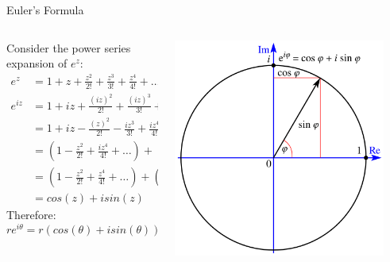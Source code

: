 \documentclass{beamer}
\begin{document}
\begin{frame}[t]{Euler's Formula}
    \begin{columns}
        \hspace{0.5em}
		\begin{column}{.6\textwidth}
            Consider the power series expansion of $e^z$: \newline
            \vspace{-1.8em}
            \begin{align*}
                e^z &= 1 + z + \frac{z^2}{2!} + \frac{z^3}{3!} + \frac{z^4}{4!} + \dots \\
                e^{iz}&= 1 + iz + \frac{(iz)^2}{2!} + \frac{(iz)^3}{3!} + \frac{(iz)^4}{4!} + \dots \\
                &= 1 + iz - \frac{(z)^2}{2!} - \frac{i z^3}{3!} + \frac{iz^4}{4!} + \dots \\
                &= (1 - \frac{z^2}{2!} + \frac{iz^4}{4!} + \dots) + (iz - \frac{i z^3}{3!} + \dots)\\
                &= (1 - \frac{z^2}{2!} + \frac{z^4}{4!} + \dots) + (iz - \frac{i z^3}{3!} + \dots)\\
                &= cos(z) + i sin(z)
            \end{align*}
            Therefore:
            \[r e^{i \theta} = r (cos(\theta) + i sin(\theta))\]
		\end{column}
        \hspace{0em}
		\begin{column}{.4\textwidth}
            \begin{center}
                \includegraphics[width=0.9\textwidth]{./img/euler.png}
            \end{center}
		\end{column}
        \hspace{2em}
	\end{columns}
\end{frame}
\end{document}
